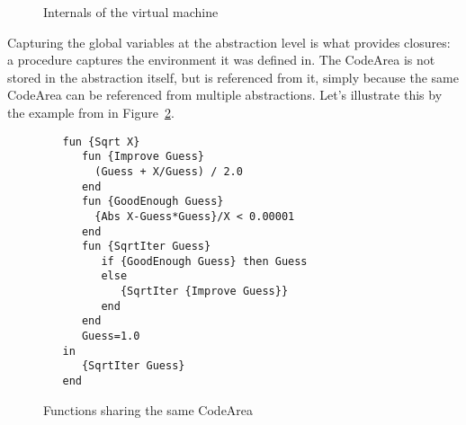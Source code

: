 \documentclass[a4paper]{memoir}
\begin{document}
\begin{figure}[h]
\caption{Internals of the virtual machine}
\label{fig:internal_virtual_machine}
\end{figure}
Capturing the global variables at the abstraction level is what provides
closures: a procedure captures the environment it was defined in.
The CodeArea is not stored in the abstraction itself, but is referenced from
it, simply because the same CodeArea can be referenced from multiple
abstractions. Let's illustrate this by the example from \cite{CTMCPFigs} in
Figure~\ref{fig:code_area_sharing}.


\begin{figure}[h]
\begin{lstlisting}
   fun {Sqrt X}
      fun {Improve Guess}
        (Guess + X/Guess) / 2.0
      end
      fun {GoodEnough Guess}
        {Abs X-Guess*Guess}/X < 0.00001
      end
      fun {SqrtIter Guess}
         if {GoodEnough Guess} then Guess
         else
            {SqrtIter {Improve Guess}}
         end
      end
      Guess=1.0
   in
      {SqrtIter Guess}
   end
\end{lstlisting}
\caption{Functions sharing the same CodeArea}
\label{fig:code_area_sharing}
\end{figure}
\end{document}

